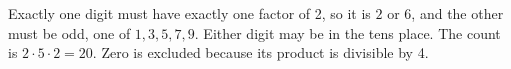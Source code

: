 Exactly one digit must have exactly one factor of 2, so it is $2$ or $6$, and the other must be odd, one of $1,3,5,7,9$. Either digit may be in the tens place. The count is $2\cdot5\cdot2=\boxed{20}$. Zero is excluded because its product is divisible by 4.
